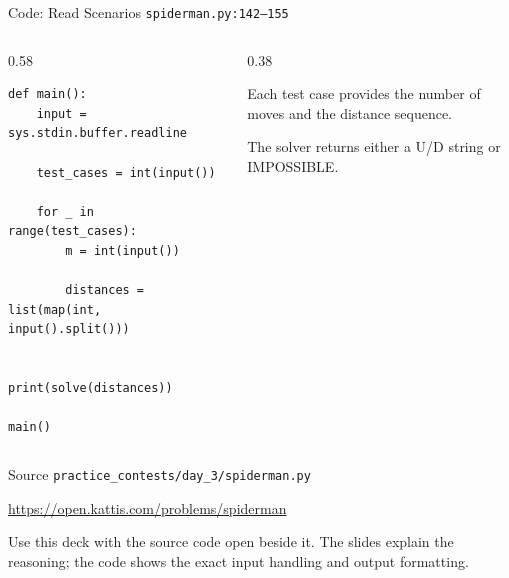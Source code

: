 \documentclass[aspectratio=169,11pt]{beamer}
\begin{document}
\begin{frame}[fragile]{Code: Read Scenarios}
\scriptsize
{} \texttt{spiderman.py:142--155}

\vspace{0.08cm}
\begin{columns}[T,totalwidth=\textwidth]
\begin{column}{0.58\textwidth}
\begin{lstlisting}[style=cpcode]
def main():
    input = sys.stdin.buffer.readline

    test_cases = int(input())

    for _ in range(test_cases):
        m = int(input())

        distances = list(map(int, input().split()))

        print(solve(distances))

main()
\end{lstlisting}
\end{column}
\begin{column}{0.38\textwidth}
\begin{tightitemize}
  \item Each test case provides the number of moves and the distance sequence.
  \item The solver returns either a U/D string or IMPOSSIBLE.
\end{tightitemize}
\end{column}
\end{columns}
\end{frame}

\begin{frame}{Source}
\small
{} \texttt{practice\_contests/day\_3/spiderman.py}

\vspace{0.3cm}
 \url{https://open.kattis.com/problems/spiderman}

\vspace{0.45cm}
Use this deck with the source code open beside it. The slides explain the reasoning; the code shows the exact input handling and output formatting.
\end{frame}
\end{document}
